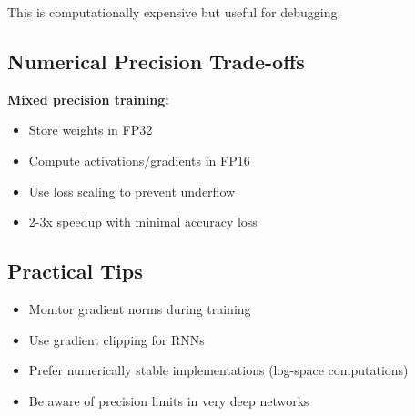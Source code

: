This is computationally expensive but useful for debugging.

\subsection{Numerical Precision Trade-offs}

\textbf{Mixed precision training:}
\begin{itemize}
    \item Store weights in FP32
    \item Compute activations/gradients in FP16
    \item Use loss scaling to prevent underflow
    \item 2-3x speedup with minimal accuracy loss
\end{itemize}

\subsection{Practical Tips}

\begin{itemize}
    \item Monitor gradient norms during training
    \item Use gradient clipping for RNNs
    \item Prefer numerically stable implementations (log-space computations)
    \item Be aware of precision limits in very deep networks
\end{itemize}
